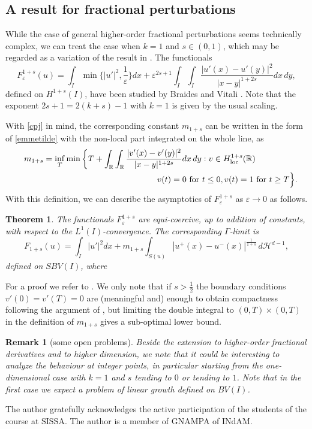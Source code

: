 \documentclass{article}
\newtheorem{remark}[lemma]{Remark}
\newtheorem{theorem}[lemma]{Theorem}
\newcommand{\e}{\varepsilon}
\begin{document}
\subsection{A result for fractional perturbations}
While the case of general higher-order fractional perturbations seems technically complex, we can treat the case  when  $k=1$ and $s\in(0,1)$, which may be regarded as a variation of the result in \cite{ABG}. The functionals 
$$
F^{1+s}_\e(u)=\int_I \min\Big\{|u'|^2,\frac1\e\Big\}dx+\e^{2s +1}\int_I\int_I \frac{|u'(x)-u'(y)|^2}{|x-y|^{1+2s}}dx\,dy,
$$
defined on $H^{1+s}(I)$, have been studied by Braides and Vitali \cite{BV}. Note that the exponent $2s+1=2(k+s)-1$ with $k=1$ is given by the usual scaling.



With \eqref{cpj} in mind, the corresponding constant $m_{1+s}$ can be written in the form of \eqref{emmetilde}
with the non-local part integrated on the whole line, as
\begin{eqnarray*}
&&m_{1+s}=\inf_T\min\bigg\{ T+\int_{\mathbb R}\int_{\mathbb R} \frac{|v'(x)-v'(y)|^2}{|x-y|^{1+2s}} dx\,dy:  v\in H^{1+s}_{\rm loc}(\mathbb R)\ \qquad\ \qquad\ \\ 
&&\hskip4cm v(t)=0 \hbox{ for }t\le 0, v(t)=1 \hbox{ for }t\ge T\Big\}.
\end{eqnarray*}
With this definition, we can describe the asymptotics of $F^{1+s}_\e$ as $\e\to 0$ as follows.

\begin{theorem} The functionals $F^{1+s}_\e$ are equi-coercive, up to addition of constants, with respect to the $L^1(I)$-convergence. The corresponding $\Gamma$-limit is 
$$
F_{1+s}(u)= 
\int_I|u'|^2dx+ m_{1+s}\int_{S(u)} |u^+(x)-u^-(x)|^{\frac1{1+s}}\, d{\mathcal H}^{d-1},
$$
defined on $SBV(I)$, where 
\end{theorem}

For a proof we refer to \cite{BV}. We only note that if $s>\frac12$ the boundary conditions $v'(0)=v'(T)=0$ are (meaningful and) enough to obtain compactness following the argument of \cite{ABG}, but limiting the double integral to $(0,T)\times (0,T)$ in the definition of $m_{1+s}$ gives a sub-optimal lower bound.

\begin{remark}[some open problems]\rm
Beside the extension to higher-order fractional derivatives and to higher dimension, we note that it could be interesting to analyze the behaviour at integer points, in particular starting from the one-dimensional case with $k=1$ and $s$ tending to $0$ or tending to $1$. Note that in the first case we expect a problem of linear growth defined on $BV(I)$.
\end{remark}

The author gratefully acknowledges the active participation of the students of the course at SISSA. The author is a member of GNAMPA of INdAM. 





\end{document}

